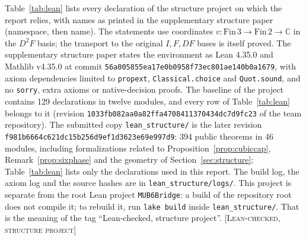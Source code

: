 \documentclass[11pt]{article}
\newcommand{\C}{\mathbb{C}}
\newcommand{\st}[1]{\textsc{[#1]}}
\newcommand{\stlean}{\st{Lean-checked, structure project}}
\theoremstyle{definition}
\theoremstyle{remark}
\begin{document}
Table~\ref{tab:lean} lists every declaration of the structure project on which the report relies, with names as printed in
the supplementary structure paper (namespace, then name). The statements use coordinates $v:\mathrm{Fin}\,3\to\mathrm{Fin}\,2\to\C$
in the $D^2F$ basis; the transport to the original $I,F,DF$ bases is itself proved. The supplementary structure paper states the
environment as Lean 4.35.0 and Mathlib v4.35.0 at commit \texttt{56a005855ea17e0b0958f73ec801ae140b0a1679}, with
axiom dependencies limited to \texttt{propext}, \texttt{Classical.choice} and \texttt{Quot.sound}, and no
\texttt{sorry}, extra axioms or native-decision proofs. The baseline of the project contains 129 declarations in twelve modules, and every row of
Table~\ref{tab:lean} belongs to it (revision \texttt{1033fb082aa0a82ffa4708411370434dc7d9fc23} of the team repository). The submitted copy \texttt{lean\_structure/} is the later revision
\texttt{f981b6664c621dc15b256d9ef1d3623e69e997d9}: 394 public theorems in 46
modules, including formalizations related to Proposition~\ref{prop:cubiccap}, Remark~\ref{prop:sixphase} and the
geometry of Section~\ref{sec:structure}; Table~\ref{tab:lean} lists only the declarations used in this report. The build log, the axiom log and the source hashes are in
\texttt{lean\_structure/logs/}. This project is separate from the root Lean
project \texttt{MUB6Bridge}: a build of the repository root does not compile it; to rebuild it, run \texttt{lake build} inside \texttt{lean\_structure/}. That is the meaning of the tag ``Lean-checked, structure
project''. \stlean
\end{document}
